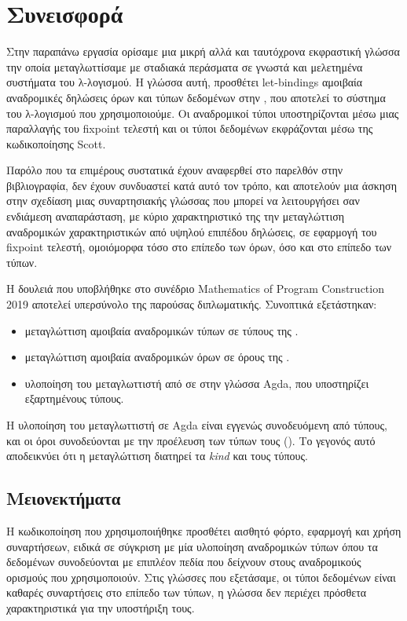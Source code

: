 \section{Συνεισφορά}
Στην παραπάνω εργασία ορίσαμε μια μικρή αλλά και ταυτόχρονα εκφραστική γλώσσα
την οποία μεταγλωττίσαμε με σταδιακά περάσματα σε γνωστά και μελετημένα συστήματα του λ-λογισμού.
Η γλώσσα αυτή, \FIR{} προσθέτει let-bindings αμοιβαία αναδρομικές δηλώσεις όρων και τύπων δεδομένων
στην \FOMF, που αποτελεί το σύστημα του λ-λογισμού που χρησιμοποιούμε. Οι αναδρομικοί τύποι
υποστηρίζονται μέσω μιας παραλλαγής του fixpoint τελεστή και οι τύποι δεδομένων εκφράζονται
μέσω της κωδικοποίησης Scott.

Παρόλο που τα επιμέρους συστατικά έχουν αναφερθεί στο παρελθόν στην βιβλιογραφία, δεν έχουν
συνδυαστεί κατά αυτό τον τρόπο, και αποτελούν μια άσκηση στην σχεδίαση μιας συναρτησιακής
γλώσσας που μπορεί να λειτουργήσει σαν ενδιάμεση αναπαράσταση, με κύριο χαρακτηριστικό της
την μεταγλώττιση αναδρομικών χαρακτηριστικών από υψηλού επιπέδου δηλώσεις, σε εφαρμογή
του fixpoint τελεστή, ομοιόμορφα τόσο στο επίπεδο των όρων, όσο και στο επίπεδο των τύπων.

Η δουλειά που υποβλήθηκε στο συνέδριο Μathematics of Program Construction 2019  αποτελεί υπερσύνολο
της παρούσας διπλωματικής. Συνοπτικά
εξετάστηκαν:
\begin{itemize}
\item μεταγλώττιση αμοιβαία αναδρομικών τύπων σε τύπους της \FOMF{}.
\item μεταγλώττιση αμοιβαία αναδρομικών όρων σε όρους της \FOMF{}.
\item υλοποίηση του μεταγλωττιστή από \FIR{} σε \FOMF{} στην γλώσσα Agda, που υποστηρίζει
εξαρτημένους τύπους.
\end{itemize}
Η υλοποίηση του μεταγλωττιστή σε Agda είναι εγγενώς συνοδευόμενη από τύπους, και οι όροι συνοδεύονται
με την προέλευση των τύπων τους (\cite{altenkirch}). Το γεγονός αυτό αποδεικνύει ότι η μεταγλώττιση διατηρεί τα \emph{kind} και τους τύπους.


\subsection{Μειονεκτήματα}

Η κωδικοποίηση που χρησιμοποιήθηκε προσθέτει αισθητό φόρτο, εφαρμογή και χρήση συναρτήσεων, ειδικά
σε σύγκριση με μία υλοποίηση αναδρομικών τύπων όπου τα δεδομένων συνοδεύονται με επιπλέον πεδία που
δείχνουν στους αναδρομικούς ορισμούς που χρησιμοποιούν. Στις γλώσσες που εξετάσαμε, οι τύποι δεδομένων είναι
καθαρές συναρτήσεις στο επίπεδο των τύπων, η γλώσσα δεν περιέχει πρόσθετα χαρακτηριστικά για την υποστήριξη τους.


